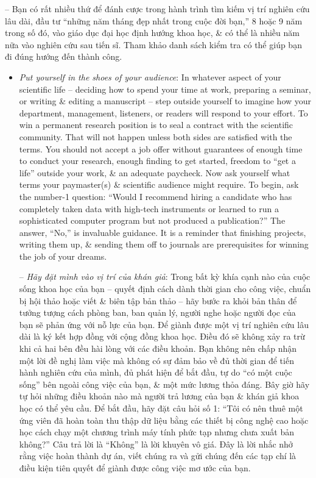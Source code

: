 \documentclass{article}
\begin{document}
\begin{enumerate}
\begin{itemize}
		-- Bạn có rất nhiều thứ để đánh cược trong hành trình tìm kiếm vị trí nghiên cứu lâu dài, đầu tư ``những năm tháng đẹp nhất trong cuộc đời bạn,'' 8 hoặc 9 năm trong số đó, vào giáo dục đại học định hướng khoa học, \& có thể là nhiều năm nữa vào nghiên cứu sau tiến sĩ. Tham khảo danh sách kiểm tra có thể giúp bạn đi đúng hướng đến thành công.
		\begin{itemize}
			\item {\it Put yourself in the shoes of your audience}: In whatever aspect of your scientific life -- deciding how to spend your time at work, preparing a seminar, or writing \& editing a manuscript -- step outside yourself to imagine how your department, management, listeners, or readers will respond to your effort. To win a permanent research position is to seal a contract with the scientific community. That will not happen unless both sides are satisfied with the terms. You should not accept a job offer without guarantees of enough time to conduct your research, enough finding to get started, freedom to ``get a life'' outside your work, \& an adequate paycheck. Now ask yourself what terms your paymaster(s) \& scientific audience might require. To begin, ask the number-1 question: ``Would I recommend hiring a candidate who has completely taken data with high-tech instruments or learned to run a sophisticated computer program but not produced a publication?'' The answer, ``No,'' is invaluable guidance. It is a reminder that finishing projects, writing them up, \& sending them off to journals are prerequisites for winning the job of your dreams.
			
			-- {\it Hãy đặt mình vào vị trí của khán giả}: Trong bất kỳ khía cạnh nào của cuộc sống khoa học của bạn -- quyết định cách dành thời gian cho công việc, chuẩn bị hội thảo hoặc viết \& biên tập bản thảo -- hãy bước ra khỏi bản thân để tưởng tượng cách phòng ban, ban quản lý, người nghe hoặc người đọc của bạn sẽ phản ứng với nỗ lực của bạn. Để giành được một vị trí nghiên cứu lâu dài là ký kết hợp đồng với cộng đồng khoa học. Điều đó sẽ không xảy ra trừ khi cả hai bên đều hài lòng với các điều khoản. Bạn không nên chấp nhận một lời đề nghị làm việc mà không có sự đảm bảo về đủ thời gian để tiến hành nghiên cứu của mình, đủ phát hiện để bắt đầu, tự do ``có một cuộc sống'' bên ngoài công việc của bạn, \& một mức lương thỏa đáng. Bây giờ hãy tự hỏi những điều khoản nào mà người trả lương của bạn \& khán giả khoa học có thể yêu cầu. Để bắt đầu, hãy đặt câu hỏi số 1: ``Tôi có nên thuê một ứng viên đã hoàn toàn thu thập dữ liệu bằng các thiết bị công nghệ cao hoặc học cách chạy một chương trình máy tính phức tạp nhưng chưa xuất bản không?'' Câu trả lời là ``Không'' là lời khuyên vô giá. Đây là lời nhắc nhở rằng việc hoàn thành dự án, viết chúng ra và gửi chúng đến các tạp chí là điều kiện tiên quyết để giành được công việc mơ ước của bạn.
			

\end{itemize}
\end{itemize}
\end{enumerate}
\end{document}
